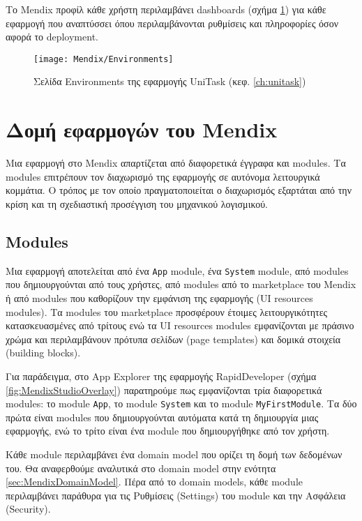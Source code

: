             Το Mendix προφίλ κάθε χρήστη περιλαμβάνει dashboards (σχήμα \ref{fig:MendixEnvironments}) για κάθε εφαρμογή που αναπτύσσει όπου περιλαμβάνονται ρυθμίσεις και πληροφορίες όσον αφορά το deployment.

            \begin{figure}[h!] \noindent \centering
                \texttt{[image: Mendix/Environments]}
                \caption{\centering Σελίδα Environments της εφαρμογής UniTask (κεφ. \ref{ch:unitask})}
                \label{fig:MendixEnvironments}
            \end{figure}


    \section{Δομή εφαρμογών του Mendix}
        Μια εφαρμογή στο Mendix απαρτίζεται από διαφορετικά έγγραφα και modules. Τα modules επιτρέπουν τον διαχωρισμό της εφαρμογής σε αυτόνομα λειτουργικά κομμάτια. Ο τρόπος με τον οποίο πραγματοποιείται ο διαχωρισμός εξαρτάται από την κρίση και τη σχεδιαστική προσέγγιση του μηχανικού λογισμικού.

        \subsection{Modules}
            Μια εφαρμογή αποτελείται από ένα \texttt{App} module, ένα \texttt{System} module, από modules που δημιουργούνται από τους χρήστες, από modules από το marketplace του Mendix ή από modules που καθορίζουν την εμφάνιση της εφαρμογής (UI resources modules). Τα modules του marketplace προσφέρουν έτοιμες λειτουργικότητες κατασκευασμένες από τρίτους ενώ τα UI resources modules εμφανίζονται με πράσινο χρώμα και περιλαμβάνουν πρότυπα σελίδων (page templates) και δομικά στοιχεία (building blocks).

            Για παράδειγμα, στο App Explorer της εφαρμογής RapidDeveloper (σχήμα \ref{fig:MendixStudioOverlay}) παρατηρούμε πως εμφανίζονται τρία διαφορετικά modules: το module \texttt{App}, το module \texttt{System} και το module \texttt{MyFirstModule}. Τα δύο πρώτα είναι modules που δημιουργούνται αυτόματα κατά τη δημιουργία μιας εφαρμογής, ενώ το τρίτο είναι ένα module που δημιουργήθηκε από τον χρήστη.

            Κάθε module περιλαμβάνει ένα domain model που ορίζει τη δομή των δεδομένων του. Θα αναφερθούμε αναλυτικά στο domain model στην ενότητα \ref{sec:MendixDomainModel}. Πέρα από το domain models, κάθε module περιλαμβάνει παράθυρα για τις Ρυθμίσεις (Settings) του module και την Ασφάλεια (Security).

